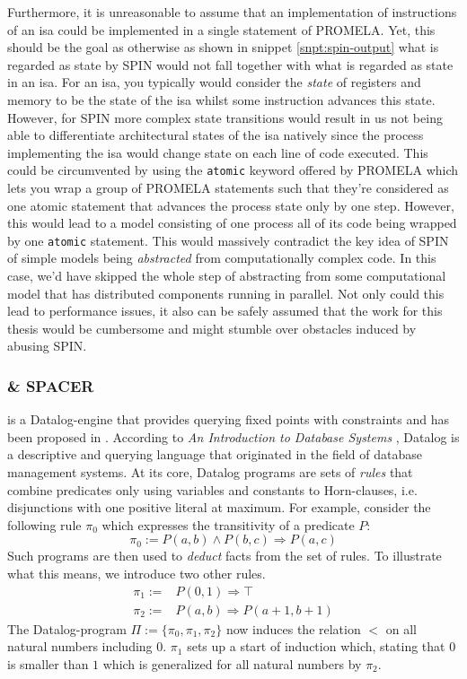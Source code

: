 Furthermore, it is unreasonable to assume that an implementation of instructions of an \gls{isa} could be implemented in a single statement of PROMELA.
Yet, this should be the goal as otherwise as shown in snippet \ref{snpt:spin-output} what is regarded as state by SPIN would not fall together with what is regarded as state in an \gls{isa}.
For an \gls{isa}, you typically would consider the \textit{state} of registers and memory to be the state of the \gls{isa} whilst some instruction advances this state.
However, for SPIN more complex state transitions would result in us not being able to differentiate architectural states of the \gls{isa} natively since the process implementing the \gls{isa} would change state on each line of code executed.
This could be circumvented by using the \lstinline{atomic} keyword offered by PROMELA which lets you wrap a group of PROMELA statements such that they're considered as one atomic statement that advances the process state only by one step.
However, this would lead to a model consisting of one process all of its code being wrapped by one \lstinline{atomic} statement.
This would massively contradict the key idea of SPIN of simple models being \textit{abstracted} from computationally complex code.
In this case, we'd have skipped the whole step of abstracting from some computational model that has distributed components running in parallel.
Not only could this lead to performance issues, it also can be safely assumed that the work for this thesis would be cumbersome and might stumble over obstacles induced by abusing SPIN.

\subsubsection{\muZ{} \& SPACER}
\label{sec:spacer}

\muZ{} is a Datalog-engine that provides querying fixed points with constraints and has been proposed in \cite{Hoder11}.
According to \textit{An Introduction to Database Systems} \cite[p.790ff]{Date00}, Datalog is a descriptive and querying language that originated in the field of database management systems.
At its core, Datalog programs are sets of \textit{rules} that combine predicates only using variables and constants to Horn-clauses, i.e. disjunctions with one positive literal at maximum.
For example, consider the following rule $ \pi_0 $ which expresses the transitivity of a predicate $ P $:
\begin{equation*}
    \pi_0 := P(a, b) \land P(b, c) \Rightarrow P(a, c)
\end{equation*}
Such programs are then used to \textit{deduct} facts from the set of rules.
To illustrate what this means, we introduce two other rules.
\begin{align*}
    \pi_1 := & P(0, 1) \Rightarrow \top \\
    \pi_2 := & P(a, b) \Rightarrow P(a + 1, b + 1)
\end{align*}
The Datalog-program $ \Pi := \{ \pi_0, \pi_1, \pi_2 \} $ now induces the relation $ < $ on all natural numbers including $ 0 $.
$ \pi_1 $ sets up a start of induction which, stating that $ 0 $ is smaller than $ 1 $ which is generalized for all natural numbers by $ \pi_2 $.

